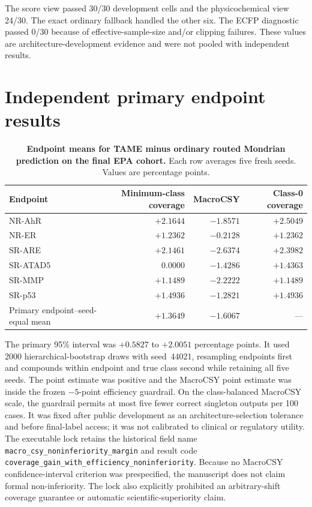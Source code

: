 \documentclass[10pt]{article}
\begin{document}
The score view passed 30/30 development cells and the physicochemical view 24/30. The exact ordinary fallback handled the other six. The ECFP diagnostic passed 0/30 because of effective-sample-size and/or clipping failures. These values are architecture-development evidence and were not pooled with independent results.

\section{Independent primary endpoint results}

\begin{table}[!htbp]
\centering
\caption{\textbf{Endpoint means for TAME minus ordinary routed Mondrian prediction on the final EPA cohort.} Each row averages five fresh seeds. Values are percentage points.}
\small
\begin{tabular}{lrrr}
\toprule
Endpoint & Minimum-class coverage & MacroCSY & Class-0 coverage \\
\midrule
NR-AhR & $+2.1644$ & $-1.8571$ & $+2.5049$ \\
NR-ER & $+1.2362$ & $-0.2128$ & $+1.2362$ \\
SR-ARE & $+2.1461$ & $-2.6374$ & $+2.3982$ \\
SR-ATAD5 & $\phantom{+}0.0000$ & $-1.4286$ & $+1.4363$ \\
SR-MMP & $+1.1489$ & $-2.2222$ & $+1.1489$ \\
SR-p53 & $+1.4936$ & $-1.2821$ & $+1.4936$ \\
\midrule
Primary endpoint--seed-equal mean & $+1.3649$ & $-1.6067$ & --- \\
\bottomrule
\end{tabular}
\end{table}

The primary 95\% interval was $+0.5827$ to $+2.0051$ percentage points. It used 2000 hierarchical-bootstrap draws with seed~44021, resampling endpoints first and compounds within endpoint and true class second while retaining all five seeds. The point estimate was positive and the MacroCSY point estimate was inside the frozen $-5$-point efficiency guardrail. On the class-balanced MacroCSY scale, the guardrail permits at most five fewer correct singleton outputs per 100 cases. It was fixed after public development as an architecture-selection tolerance and before final-label access; it was not calibrated to clinical or regulatory utility. The executable lock retains the historical field name \texttt{macro\_csy\_noninferiority\_margin} and result code \texttt{coverage\_gain\_with\_efficiency\_noninferiority}. Because no MacroCSY confidence-interval criterion was prespecified, the manuscript does not claim formal non-inferiority. The lock also explicitly prohibited an arbitrary-shift coverage guarantee or automatic scientific-superiority claim.
\end{document}
